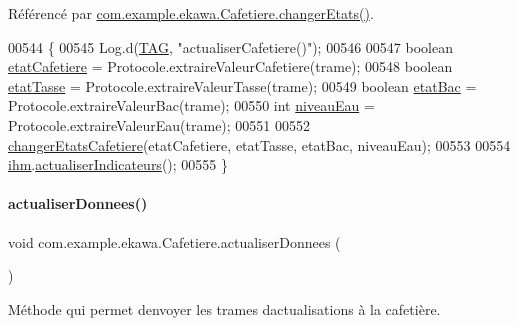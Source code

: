 Référencé par \hyperlink{_cafetiere_8java_source_l00463}{com.\+example.\+ekawa.\+Cafetiere.\+changer\+Etats()}.


\begin{DoxyCode}
00544     \{
00545         Log.d(\hyperlink{classcom_1_1example_1_1ekawa_1_1_cafetiere_aa0c1fd99a2508b06c462aea17034aa91}{TAG}, \textcolor{stringliteral}{"actualiserCafetiere()"});
00546 
00547         \textcolor{keywordtype}{boolean} \hyperlink{classcom_1_1example_1_1ekawa_1_1_cafetiere_ae170dd018d1e740b3bda080d1cc3d900}{etatCafetiere} = Protocole.extraireValeurCafetiere(trame);
00548         \textcolor{keywordtype}{boolean} \hyperlink{classcom_1_1example_1_1ekawa_1_1_cafetiere_a93c5021591facf06397e760c11556904}{etatTasse} = Protocole.extraireValeurTasse(trame);
00549         \textcolor{keywordtype}{boolean} \hyperlink{classcom_1_1example_1_1ekawa_1_1_cafetiere_a058f7a18cd9c0567d583b8bc6250d143}{etatBac} = Protocole.extraireValeurBac(trame);
00550         \textcolor{keywordtype}{int} \hyperlink{classcom_1_1example_1_1ekawa_1_1_cafetiere_aaf8e1a960f803c2de4defa414b5984a4}{niveauEau} = Protocole.extraireValeurEau(trame);
00551 
00552         \hyperlink{classcom_1_1example_1_1ekawa_1_1_cafetiere_a6fa4b1560875b71d339a9f6c24c5336d}{changerEtatsCafetiere}(etatCafetiere, etatTasse, etatBac, niveauEau);
00553 
00554         \hyperlink{classcom_1_1example_1_1ekawa_1_1_cafetiere_a7db4a63088834eda5f6a3e951611bf82}{ihm}.\hyperlink{classcom_1_1example_1_1ekawa_1_1_ihm_a2c3740dd5be20b3111b36649514fd41e}{actualiserIndicateurs}();
00555     \}
\end{DoxyCode}
\mbox{\label{classcom_1_1example_1_1ekawa_1_1_cafetiere_a1c6b2ea0e069cda876260e18ea8f6e84}} 
\paragraph{\texorpdfstring{actualiser\+Donnees()}{actualiserDonnees()}}
{\footnotesize\ttfamily void com.\+example.\+ekawa.\+Cafetiere.\+actualiser\+Donnees (\begin{DoxyParamCaption}{ }\end{DoxyParamCaption})}



Méthode qui permet d\textquotesingle{}envoyer les trames d\textquotesingle{}actualisations à la cafetière. 



